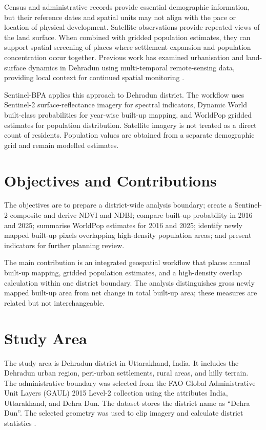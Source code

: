 \documentclass[conference]{IEEEtran}
\begin{document}
Census and administrative records provide essential demographic information, but their reference dates and spatial units may not align with the pace or location of physical development. Satellite observations provide repeated views of the land surface. When combined with gridded population estimates, they can support spatial screening of places where settlement expansion and population concentration occur together. Previous work has examined urbanisation and land-surface dynamics in Dehradun using multi-temporal remote-sensing data, providing local context for continued spatial monitoring \cite{dhankar2024,mishra2023}.

Sentinel-BPA applies this approach to Dehradun district. The workflow uses Sentinel-2 surface-reflectance imagery for spectral indicators, Dynamic World built-class probabilities for year-wise built-up mapping, and WorldPop gridded estimates for population distribution. Satellite imagery is not treated as a direct count of residents. Population values are obtained from a separate demographic grid and remain modelled estimates.

\section{Objectives and Contributions}
The objectives are to prepare a district-wide analysis boundary; create a Sentinel-2 composite and derive NDVI and NDBI; compare built-up probability in 2016 and 2025; summarise WorldPop estimates for 2016 and 2025; identify newly mapped built-up pixels overlapping high-density population areas; and present indicators for further planning review.

The main contribution is an integrated geospatial workflow that places annual built-up mapping, gridded population estimates, and a high-density overlap calculation within one district boundary. The analysis distinguishes gross newly mapped built-up area from net change in total built-up area; these measures are related but not interchangeable.

\section{Study Area}
The study area is Dehradun district in Uttarakhand, India. It includes the Dehradun urban region, peri-urban settlements, rural areas, and hilly terrain. The administrative boundary was selected from the FAO Global Administrative Unit Layers (GAUL) 2015 Level-2 collection using the attributes India, Uttarakhand, and Dehra Dun. The dataset stores the district name as ``Dehra Dun''. The selected geometry was used to clip imagery and calculate district statistics \cite{faoGaul}.
\end{document}

